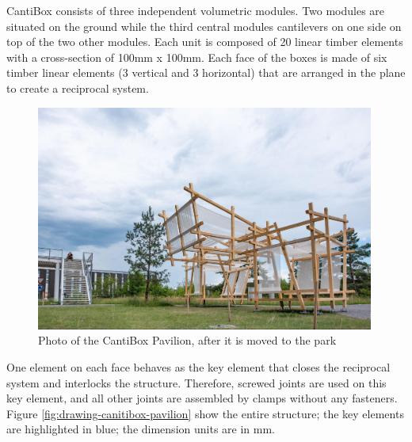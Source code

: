 CantiBox consists of three independent volumetric modules. Two modules are situated on the ground while the third central modules cantilevers on one side on top of the two other modules. Each unit is composed of 20 linear timber elements with a cross-section of 100mm x 100mm. Each face of the boxes is made of six timber linear elements (3 vertical and 3 horizontal) that are arranged in the plane to create a reciprocal system. 

\begin{figure}[!h]
    \centering
    \includegraphics[width=0.99\textwidth]{images/08/img22.jpg}
    \caption{Photo of the CantiBox Pavilion, after it is moved to the park}
    \label{fig:photo-cantibox-park}
\end{figure}

One element on each face behaves as the key element that closes the reciprocal system and interlocks the structure. Therefore, screwed joints are used on this key element, and all other joints are assembled by clamps without any fasteners. Figure \ref{fig:drawing-canitibox-pavilion} show the entire structure; the key elements are highlighted in blue; the dimension units are in mm. 

